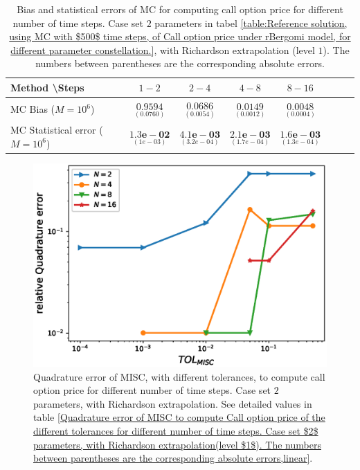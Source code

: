 \begin{table}[h!]
	\centering
	\begin{tabular}{l*{6}{c}r}
		Method \textbackslash  Steps            & $1-2$ & $2-4$ & $4-8$ & $8-16$  \\
		\hline
		MC Bias ($M=10^6$)  &$\underset{( 0.0760)}{\mathbf{0.9594}}$  & $\underset{( 0.0054)}{\mathbf{0.0686}}$  & $\underset{(   0.0012)}{\mathbf{0.0149}}$  & $\underset{(  0.0004)}{\mathbf{0.0048}}$ \\	
		
		MC Statistical error ($M=10^6$)   & $\underset{( 1e-03)}{\mathbf{1.3e-02}}$  & $\underset{(   3.2e-04)}{\mathbf{4.1e-03}}$  & $\underset{(  1.7e-04)}{\mathbf{2.1e-03}}$ & $\underset{(  1.3e-04)}{\mathbf{1.6e-03}}$ \\	
		\hline
	\end{tabular}
	\caption{Bias and statistical errors of MC   for computing call option price  for different number of time steps. Case set $2$ parameters in tabel \ref{table:Reference solution, using MC with $500$ time steps, of Call option price under rBergomi model, for different parameter constellation.}, with Richardson extrapolation (level $1$). The numbers between parentheses are the corresponding absolute errors.}
	\label{Bias and Statistical errors of MC ($M=10^6$)  for computing Call option price  for different number of time steps. Case set $2$ parameters, with Richardson extrapolation (level1). The numbers between parentheses are the corresponding absolute errors.}
\end{table}








\begin{figure}[h!]
	\centering
	\includegraphics[width=0.5\linewidth]{./figures/rBergomi_MISC_quadratre_error/vs_TOL/set2/relative_quad_error_wrt_MISC_TOL_set2_with_rich_linear}
	
	
	\caption{Quadrature error of MISC, with different tolerances,  to compute call option price for different number of time steps. Case  set $2$ parameters, with Richardson extrapolation.  See detailed values  in table \ref{Quadrature error of MISC to compute Call option price of the different tolerances for different number of time steps. Case set $2$ parameters, with Richardson extrapolation(level $1$). The numbers between parentheses are the corresponding absolute errors,linear}.}
	\label{fig:Quadrature_error_set2_linear_rich}
\end{figure}


